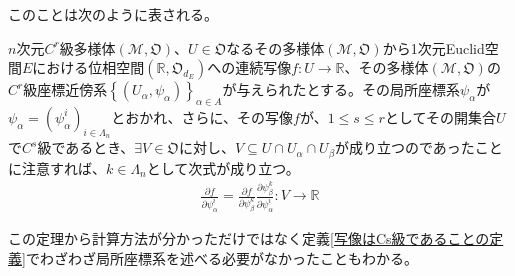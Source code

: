 \documentclass[dvipdfmx]{jsarticle}
\begin{document}
このことは次のように表される。
\begin{center}
\end{center}
\begin{thm}\label{8.3.2.3}
$n$次元$C^{r}$級多様体$\left( \mathcal{M},\mathfrak{O} \right)$、$U \in \mathfrak{O}$なるその多様体$\left( \mathcal{M},\mathfrak{O} \right)$から1次元Euclid空間$E$における位相空間$\left( \mathbb{R},\mathfrak{O}_{d_{E}} \right)$への連続写像$f:U \rightarrow \mathbb{R}$、その多様体$\left( \mathcal{M},\mathfrak{O} \right)$の$C^{r}$級座標近傍系$\left\{ \left( U_{\alpha},\psi_{\alpha} \right) \right\}_{\alpha \in A}$が与えられたとする。その局所座標系$\psi_\alpha $が$\psi_\alpha =\left( \psi_\alpha^i \right)_{i\in \varLambda_n }$とおかれ、さらに、その写像$f$が、$1\leq s \leq r$としてその開集合$U$で$C^{s}$級であるとき、$\exists V\in \mathfrak{O}$に対し、$V\subseteq U\cap U_\alpha \cap U_\beta $が成り立つのであったことに注意すれば、$k\in \varLambda_n $として次式が成り立つ。
\begin{align*}
\frac{\partial f}{\partial \psi_\alpha^i } = \frac{\partial f}{\partial \psi_\beta^k } \frac{\partial \psi_\beta^k }{\partial \psi_\alpha^i } : V\rightarrow \mathbb{R}
\end{align*}
\end{thm}\par
この定理から計算方法が分かっただけではなく定義\ref{写像はCs級であることの定義}でわざわざ局所座標系を述べる必要がなかったこともわかる。
\end{document}
